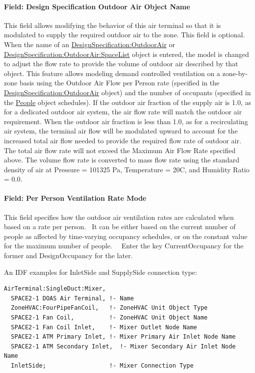 \paragraph{Field: Design Specification Outdoor Air Object Name}\label{field-DSOA-object-name}

This field allows modifying the behavior of this air terminal so that it is modulated to supply the required outdoor air to the zone.  This field is optional. When the name of an \hyperref[designspecificationoutdoorair]{DesignSpecification:OutdoorAir} or \hyperref[designspecificationoutdoorairspacelist]{DesignSpecification:OutdoorAir:SpaceList} object is entered, the model is changed to adjust the flow rate to provide the volume of outdoor air described by that object.  This feature allows modeling demand controlled ventilation on a zone-by-zone basis using the Outdoor Air Flow per Person rate (specified in the \hyperref[designspecificationoutdoorair]{DesignSpecification:OutdoorAir} object) and the number of occupants (specified in the \hyperref[people]{People} object schedules).  If the outdoor air fraction of the supply air is 1.0, as for a dedicated outdoor air system, the air flow rate will match the outdoor air requirement. When the outdoor air fraction is less than 1.0, as for a recirculating air system, the terminal air flow will be modulated upward to account for the increased total air flow needed to provide the required flow rate of outdoor air.   The total air flow rate will not exceed the Maximum Air Flow Rate specified above. The volume flow rate is converted to mass flow rate using the standard density of air at Pressure = 101325 Pa, Temperature = 20C, and Humidity Ratio = 0.0.

\paragraph{Field: Per Person Ventilation Rate Mode}

This field specifies how the outdoor air ventilation rates are calculated when based on a rate per person.~ It can be either based on the current number of people as affected by time-varying occupancy schedules, or on the constant value for the maximum number of people.~~ Enter the key CurrentOccupancy for the former and DesignOccupancy for the later.

An IDF examples for InletSide and SupplySide connection type:

\begin{lstlisting}
AirTerminal:SingleDuct:Mixer,
  SPACE2-1 DOAS Air Terminal, !- Name
  ZoneHVAC:FourPipeFanCoil,   !- ZoneHVAC Unit Object Type
  SPACE2-1 Fan Coil,          !- ZoneHVAC Unit Object Name
  SPACE2-1 Fan Coil Inlet,    !- Mixer Outlet Node Name
  SPACE2-1 ATM Primary Inlet, !- Mixer Primary Air Inlet Node Name
  SPACE2-1 ATM Secondary Inlet,  !- Mixer Secondary Air Inlet Node Name
  InletSide;                  !- Mixer Connection Type
\end{lstlisting}

